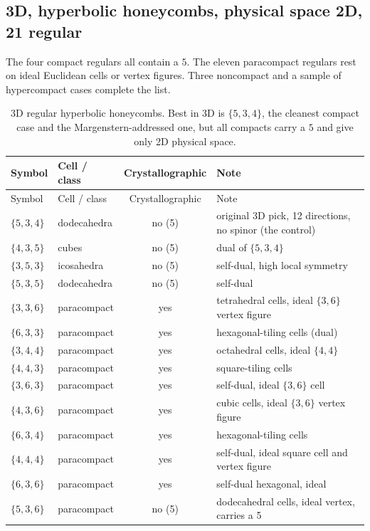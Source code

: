 \subsection{3D, hyperbolic honeycombs, physical space 2D, 21 regular}

The four compact regulars all contain a $5$. The eleven paracompact regulars rest on ideal Euclidean cells or
vertex figures. Three noncompact and a sample of hypercompact cases complete the list.

{\small
\begin{longtable}{l l c p{2.9in}}
\caption{3D regular hyperbolic honeycombs. Best in 3D is $\{5,3,4\}$, the cleanest compact case and the
Margenstern-addressed one, but all compacts carry a $5$ and give only 2D physical space.}
\label{tab:catalog-3d}\\
\toprule
Symbol & Cell / class & Crystallographic & Note \\
\midrule
\endfirsthead
\toprule
Symbol & Cell / class & Crystallographic & Note \\
\midrule
\endhead
\bottomrule
\endfoot
$\{5,3,4\}$ & dodecahedra & no (5) & original 3D pick, 12 directions, no spinor (the control) \\
$\{4,3,5\}$ & cubes & no (5) & dual of $\{5,3,4\}$ \\
$\{3,5,3\}$ & icosahedra & no (5) & self-dual, high local symmetry \\
$\{5,3,5\}$ & dodecahedra & no (5) & self-dual \\
$\{3,3,6\}$ & paracompact & yes & tetrahedral cells, ideal $\{3,6\}$ vertex figure \\
$\{6,3,3\}$ & paracompact & yes & hexagonal-tiling cells (dual) \\
$\{3,4,4\}$ & paracompact & yes & octahedral cells, ideal $\{4,4\}$ \\
$\{4,4,3\}$ & paracompact & yes & square-tiling cells \\
$\{3,6,3\}$ & paracompact & yes & self-dual, ideal $\{3,6\}$ cell \\
$\{4,3,6\}$ & paracompact & yes & cubic cells, ideal $\{3,6\}$ vertex figure \\
$\{6,3,4\}$ & paracompact & yes & hexagonal-tiling cells \\
$\{4,4,4\}$ & paracompact & yes & self-dual, ideal square cell and vertex figure \\
$\{6,3,6\}$ & paracompact & yes & self-dual hexagonal, ideal \\
$\{5,3,6\}$ & paracompact & no (5) & dodecahedral cells, ideal vertex, carries a 5 \\

\end{longtable}}
